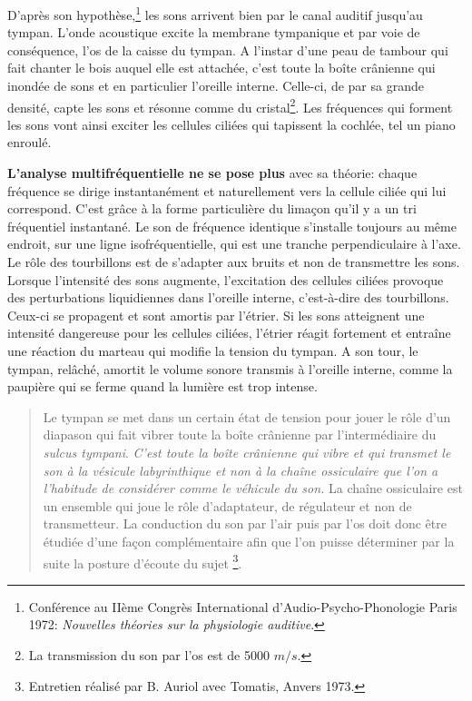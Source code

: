       
D'après son hypothèse,\footnote{Conférence au IIème Congrès International d'Audio-Psycho-Phonologie
Paris 1972:  \emph{Nouvelles théories sur la physiologie auditive}.} les sons arrivent bien par le canal auditif
jusqu'au tympan. L'onde acoustique excite la membrane tympanique et
par voie de conséquence, l'os de la caisse du tympan. 
A l'instar d'une
peau de tambour qui fait chanter le bois auquel elle est attachée,
c'est toute la boîte crânienne qui inondée de sons et en particulier
l'oreille interne. Celle-ci, de par sa grande densité, capte les sons
et résonne comme du cristal\footnote{La transmission du son par l'os est de 
5000 $m/s$.}.
Les fréquences qui forment les sons vont ainsi exciter les cellules
ciliées qui tapissent la cochlée, tel un piano enroulé.
{\textbf{L'analyse multifréquentielle ne se pose plus} 
avec sa théorie: chaque fréquence se dirige instantanément et
naturellement vers la cellule ciliée qui lui correspond. 
C'est grâce à la forme particulière du limaçon qu'il y a un tri fréquentiel 
instantané.
Le son de fréquence identique s'installe toujours au même endroit, sur une 
ligne isofréquentielle, qui est une tranche perpendiculaire à l'axe.
Le rôle des tourbillons est de s'adapter aux bruits
et non de transmettre les sons.
Lorsque l'intensité des sons aug\-men\-te,
l'ex\-ci\-ta\-tion des cellules ciliées provoque des perturbations liquidiennes
dans l'oreille interne, c'est-à-dire des tourbillons. Ceux-ci se propagent
et sont amortis par l'étrier. Si les sons atteignent une intensité
dangereuse pour les cellules ciliées, l'étrier réagit fortement et
entraîne une réaction du marteau qui modifie la tension du tympan.
A son tour, le tympan, relâché, amortit le volume sonore transmis
à l'oreille interne, comme la paupière qui se ferme quand la lumière
est trop intense.


\begin{quotation}
	Le tympan se met dans un certain état de tension pour jouer le
	rôle d'un diapason qui fait vibrer toute la boîte crânienne
	par l'intermédiaire du \emph{sulcus tympani}. 
	\emph{C'est toute la boîte crânienne qui vibre et qui transmet le son à 
la vésicule labyrinthique et non à la chaîne ossiculaire que l'on a l'habitude 
de considérer comme le véhicule du son.} La chaîne ossiculaire est un ensemble 
qui
	joue le rôle d'adaptateur, de régulateur et non de transmetteur. La
	conduction du son par l'air puis par l'os doit donc
	être étudiée d'une façon complémentaire afin que l'on
	puisse déterminer par la suite la posture d'écoute du sujet%
	\footnote{Entretien réalisé par B. Auriol avec Tomatis, Anvers 
1973.}.


\end{quotation}}
